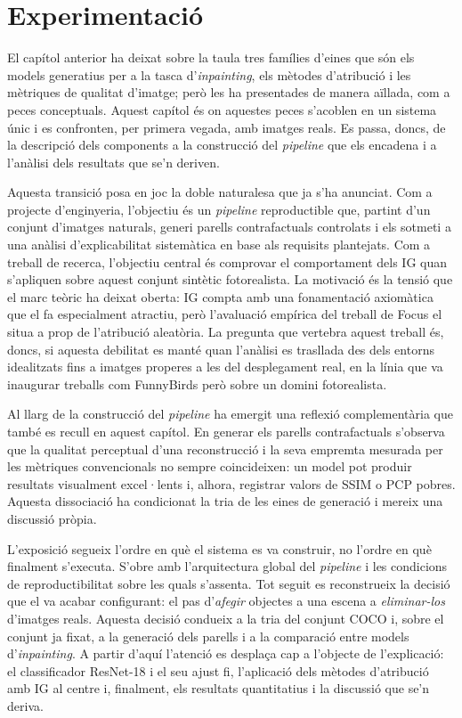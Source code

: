 
\chapter{Experimentació}\label{experimentacio}
El capítol anterior ha deixat sobre la taula tres famílies d'eines  que són els models generatius per a la tasca d'\emph{inpainting}, els mètodes d'atribució i les mètriques de qualitat d'imatge; però les ha presentades de manera aïllada, com a peces conceptuals. Aquest capítol és on aquestes peces s'acoblen en un sistema únic i es confronten, per primera vegada, amb imatges reals. Es passa, doncs, de la descripció dels components a la construcció del \emph{pipeline} que els encadena i a l'anàlisi dels resultats que se'n deriven.

Aquesta transició posa en joc la doble naturalesa que ja s'ha anunciat. Com a projecte d'enginyeria, l'objectiu és un \emph{pipeline} reproductible que, partint d'un conjunt d'imatges naturals, generi parells contrafactuals controlats i els sotmeti a una anàlisi d'explicabilitat sistemàtica en base als requisits plantejats. Com a treball de recerca, l'objectiu central és comprovar el comportament dels \ac{IG} quan s'apliquen sobre aquest conjunt sintètic fotorealista. La motivació és la tensió que el marc teòric ha deixat oberta: \ac{IG} compta amb una fonamentació axiomàtica que el fa especialment atractiu, però l'avaluació empírica del treball de Focus el situa a prop de l'atribució aleatòria. La pregunta que vertebra aquest treball és, doncs, si aquesta debilitat es manté quan l'anàlisi es trasllada des dels entorns idealitzats fins a imatges properes a les del desplegament real, en la línia que va inaugurar treballs com FunnyBirds\cite{Hesse2023} però sobre un domini fotorealista.

Al llarg de la construcció del \emph{pipeline} ha emergit una reflexió complementària que també es recull en aquest capítol. En generar els parells contrafactuals s'observa que la qualitat perceptual d'una reconstrucció i la seva empremta mesurada per les mètriques convencionals no sempre coincideixen: un model pot produir resultats visualment excel·lents i, alhora, registrar valors de \ac{SSIM} o \ac{PCP} pobres. Aquesta dissociació ha condicionat la tria de les eines de generació i mereix una discussió pròpia.

L'exposició segueix l'ordre en què el sistema es va construir, no l'ordre en què finalment s'executa. S'obre amb l'arquitectura global del \emph{pipeline} i les condicions de reproductibilitat sobre les quals s'assenta. Tot seguit es reconstrueix la decisió que el va acabar configurant: el pas d'\emph{afegir} objectes a una escena a \emph{eliminar-los} d'imatges reals. Aquesta decisió condueix a la tria del conjunt \ac{COCO} i, sobre el conjunt ja fixat, a la generació dels parells i a la comparació entre models d'\emph{inpainting}. A partir d'aquí l'atenció es desplaça cap a l'objecte de l'explicació: el classificador ResNet-18 i el seu ajust fi, l'aplicació dels mètodes d'atribució amb \ac{IG} al centre i, finalment, els resultats quantitatius i la discussió que se'n deriva.

